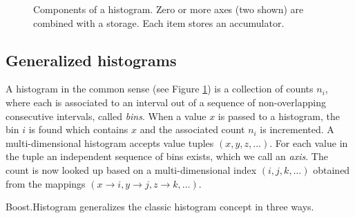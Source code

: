 \documentclass{webofc}
\begin{document}
\begin{figure}[h]
\begin{center}
		\caption{Components of a histogram. Zero or more axes (two shown) are combined with a storage. Each item stores an accumulator.}
		\label{fig-design}
	\end{center}
	
\end{figure}

\subsection{Generalized histograms}
\label{sec-bh-cpp-gen}

A histogram in the common sense (see Figure \ref{fig-design}) is a collection of counts $n_i$, where each is associated to an interval out of a sequence of non-overlapping consecutive intervals, called \emph{bins}. When a value $x$ is passed to a histogram, the bin $i$ is found which contains $x$ and the associated count $n_i$ is incremented. A multi-dimensional histogram accepts value tuples $(x, y, z, \dots)$. For each value in the tuple an independent sequence of bins exists, which we call an \emph{axis}. The count is now looked up based on a multi-dimensional index $(i,j,k,\dots)$ obtained from the mappings $(x \rightarrow i, y \rightarrow j, z \rightarrow k, \dots)$.

Boost.Histogram generalizes the classic histogram concept in three ways.
\end{document}
